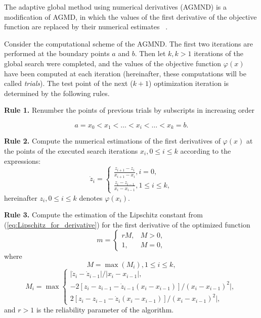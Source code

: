\documentclass[runningheads]{llncs}
\begin{document}
The adaptive global method using numerical derivatives (AGMND) is a modification of AGMD, in which the values of the first derivative of the objective function are replaced by their numerical estimates ~\cite{Gergel1997,Goryachih2017}.

Consider the computational scheme of the AGMND. The first two iterations are performed at the boundary points $a$ and $b$. Then let $k, k > 1$ iterations of the global search were completed, and the values of the objective function $\varphi(x)$ have been computed at each iteration (hereinafter, these computations will be called \textit{trials}). The test point of the next ($k+1$) optimization iteration is determined by the following rules.

\textbf{Rule 1.} Renumber the points of previous trials by subscripts in increasing order

\begin{equation}
a = x_0 < x_1 < \ldots < x_i < \ldots < x_k = b.
\end{equation} 

\textbf{Rule 2.} Compute the numerical estimations of the first derivatives of $\varphi(x)$ at the points of the executed search iterations $x_i, 0 \le i \le k$ according to the expressions:
\begin{equation}
\dot{z}_i = \left\lbrace
\begin{array}{lr}
\frac{z_{i+1}-z_i}{x_{i+1}-x_i}, i = 0, \\
\frac{z_i-z_{i-1}}{x_i-x_{i-1}}, 1 \le i \le k,
\end{array}
\right.
\end{equation}
hereinafter $z_i, 0 \le i \le k$ denotes $\varphi(x_i)$.

\textbf{Rule 3.} Compute the estimation of the Lipschitz constant from (\ref{eq:Lipschitz_for_derivative}) for the first derivative of the optimized function
\begin{equation}\label{m}
m = \left\{
\begin{array}{ll}
rM, & M > 0, \\
1, & M = 0,
\end{array}
\right.
\end{equation}
where
\begin{equation}
M = \max(M_{i}), 1 \le i \le k, 
\end{equation}
\begin{equation}
M_{i} = \max \left\{
\begin{array}{ll}
|\dot{z}_i-\dot{z}_{i-1}| / |x_i-x_{i-1}|, \\
-2[z_i-z_{i-1}-\dot{z}_{i-1}(x_i-x_{i-1})] / (x_i-x_{i-1})^2|, \\
2[z_i-z_{i-1}-\dot{z}_i(x_i-x_{i-1})] / (x_i-x_{i-1})^2|,
\end{array}
\right.
\end{equation}
and $r > 1$ is the reliability parameter of the algorithm.
\end{document}
